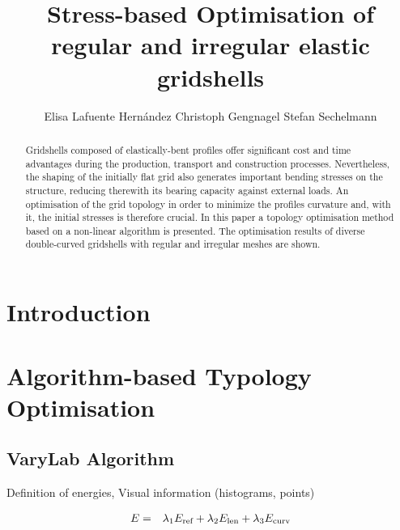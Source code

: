 \documentclass[twoside]{article}
\begin{document}
\title{Stress-based Optimisation of regular and irregular elastic gridshells}

\author{Elisa Lafuente Hern\'andez 
Christoph Gengnagel 
Stefan Sechelmann }

\maketitle

\def\shortauthor{E. L. Hern\'andez and S. Sechelmann}  %
\def\shorttitle{Variational Gridshells}   %


\begin{abstract}

Gridshells composed of elastically-bent profiles offer significant cost and time advantages during the production, transport and construction processes. Nevertheless, the shaping of the initially flat grid also generates important bending stresses on the structure, reducing therewith its bearing capacity against external loads. An optimisation of the grid topology in order to minimize the profiles curvature and, with it, the initial stresses is therefore crucial. In this paper a topology optimisation method based on a non-linear algorithm is presented. The optimisation results of diverse double-curved gridshells with regular and irregular meshes are shown.  

\end{abstract}

\section{Introduction}


\section{Algorithm-based Typology Optimisation}

\subsection{VaryLab Algorithm }

Definition of energies, Visual information (histograms, points)

\begin{eqnarray}
E&=&\lambda_1 E_{\textrm{\scriptsize{ref}}} + \lambda_2 E_{\textrm{\scriptsize{len}}} + \lambda_3 E_{\textrm{\scriptsize{curv}}}
\end{eqnarray}
\end{document}
